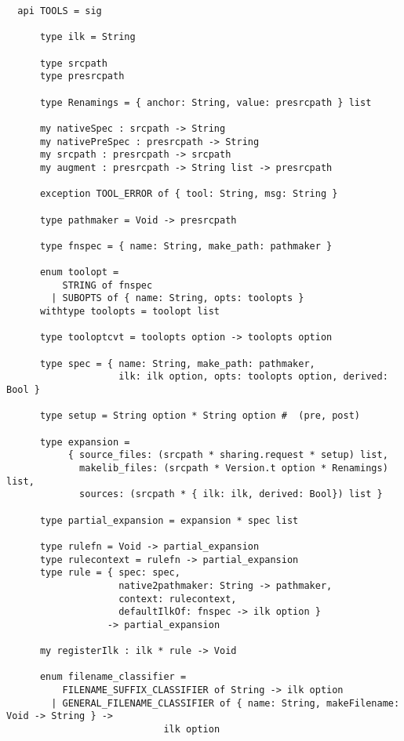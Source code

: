 \begin{small}
\begin{verbatim}
  api TOOLS = sig
  
      type ilk = String
  
      type srcpath
      type presrcpath
  
      type Renamings = { anchor: String, value: presrcpath } list
  
      my nativeSpec : srcpath -> String
      my nativePreSpec : presrcpath -> String
      my srcpath : presrcpath -> srcpath
      my augment : presrcpath -> String list -> presrcpath
  
      exception TOOL_ERROR of { tool: String, msg: String }
  
      type pathmaker = Void -> presrcpath

      type fnspec = { name: String, make_path: pathmaker }  

      enum toolopt =
          STRING of fnspec
        | SUBOPTS of { name: String, opts: toolopts }
      withtype toolopts = toolopt list
  
      type tooloptcvt = toolopts option -> toolopts option
  
      type spec = { name: String, make_path: pathmaker,
                    ilk: ilk option, opts: toolopts option, derived: Bool }
  
      type setup = String option * String option #  (pre, post) 
  
      type expansion =
           { source_files: (srcpath * sharing.request * setup) list,
             makelib_files: (srcpath * Version.t option * Renamings) list,
             sources: (srcpath * { ilk: ilk, derived: Bool}) list }
  
      type partial_expansion = expansion * spec list
  
      type rulefn = Void -> partial_expansion
      type rulecontext = rulefn -> partial_expansion
      type rule = { spec: spec,
                    native2pathmaker: String -> pathmaker,
                    context: rulecontext,
                    defaultIlkOf: fnspec -> ilk option }
                  -> partial_expansion
  
      my registerIlk : ilk * rule -> Void
  
      enum filename_classifier =
          FILENAME_SUFFIX_CLASSIFIER of String -> ilk option
        | GENERAL_FILENAME_CLASSIFIER of { name: String, makeFilename: Void -> String } ->
                            ilk option
  

\end{verbatim}
\end{small}
